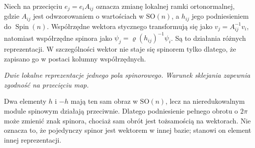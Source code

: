 \begin{uwaga}
\label{rem:pola-spinorowe-ramki}
Niech na przecięciu $e_j=e_i A_{ij}$ oznacza zmianę
lokalnej ramki ortonormalnej, gdzie $A_{ij}$ jest
odwzorowaniem o wartościach w $\mathrm{SO}(n)$,
a $h_{ij}$ jego podniesieniem do $\operatorname{Spin}(n)$.
Współrzędne wektora stycznego transformują się jako
$v_j=A_{ij}^{-1}v_i$, natomiast współrzędne spinora
jako $\psi_j=\varrho(h_{ij})^{-1}\psi_i$.
Są to działania różnych reprezentacji. W szczególności
wektor nie staje się spinorem tylko dlatego, że zapisano go
w postaci kolumny współrzędnych.
\end{uwaga}

\begin{center}

{\small\itshape Dwie lokalne reprezentacje jednego pola spinorowego.
Warunek sklejania zapewnia zgodność na przecięciu map.}
\end{center}

\begin{uwaga}
Dwa elementy $h$ i $-h$ mają ten sam obraz
w $\mathrm{SO}(n)$, lecz na nieredukowalnym module
spinowym działają przeciwnie. Dlatego podniesienie
pełnego obrotu o $2\pi$ może zmienić znak spinora,
chociaż sam obrót jest tożsamością na wektorach.
Nie oznacza to, że pojedynczy spinor jest wektorem
w innej bazie; stanowi on element innej reprezentacji.
\end{uwaga}

